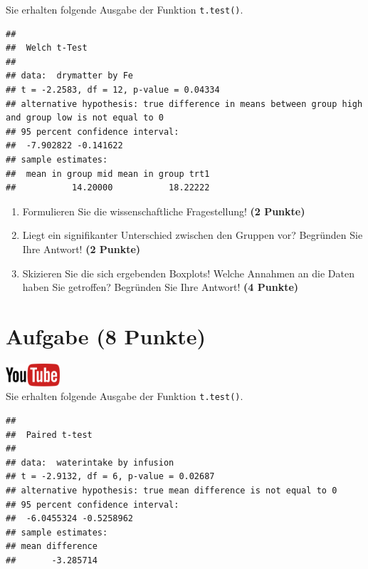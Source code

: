 \documentclass[a4paper, 10pt]{scrartcl}\usepackage[]{graphicx}\usepackage[]{xcolor}
\makeatletter
\newenvironment{kframe}{%
 \def\at@end@of@kframe{}%
 \ifinner\ifhmode%
  \def\at@end@of@kframe{\end{minipage}}%
  \begin{minipage}{\columnwidth}%
 \fi\fi%
 \def\FrameCommand##1{\hskip\@totalleftmargin \hskip-\fboxsep
 \colorbox{shadecolor}{##1}\hskip-\fboxsep
     \hskip-\linewidth \hskip-\@totalleftmargin \hskip\columnwidth}%
 \MakeFramed {\advance\hsize-\width
   \@totalleftmargin\z@ \linewidth\hsize
   \@setminipage}}%
 {\par\unskip\endMakeFramed%
 \at@end@of@kframe}
\newenvironment{knitrout}{}{} %
\makeatother
\begin{document}
Sie erhalten folgende \Rlogo Ausgabe der Funktion \texttt{t.test()}.

\begin{knitrout}
\color{fgcolor}\begin{kframe}
\begin{verbatim}
## 
## 	Welch t-Test
## 
## data:  drymatter by Fe
## t = -2.2583, df = 12, p-value = 0.04334
## alternative hypothesis: true difference in means between group high and group low is not equal to 0
## 95 percent confidence interval:
##  -7.902822 -0.141622
## sample estimates:
##  mean in group mid mean in group trt1 
##           14.20000           18.22222
\end{verbatim}
\end{kframe}
\end{knitrout}


\begin{enumerate}
  \item Formulieren Sie die wissenschaftliche Fragestellung! \textbf{(2
Punkte)}
\item Liegt ein signifikanter Unterschied zwischen den Gruppen vor?
  Begr{\"u}nden Sie Ihre Antwort! \textbf{(2 Punkte)}
\item Skizieren Sie die sich ergebenden Boxplots! Welche Annahmen an die Daten haben Sie getroffen? Begr{\"u}nden Sie Ihre Antwort! \textbf{(4 Punkte)} 
\end{enumerate}
 
\clearpage

\section{Aufgabe \hfill (8 Punkte)}

\hfill\href{https://youtu.be/kHmfEmU6lrk}{\includegraphics[width =
  2cm]{img/youtube}}\\[1Ex]


Sie erhalten folgende \Rlogo Ausgabe der Funktion \texttt{t.test()}.

\begin{knitrout}
\color{fgcolor}\begin{kframe}
\begin{verbatim}
## 
## 	Paired t-test
## 
## data:  waterintake by infusion
## t = -2.9132, df = 6, p-value = 0.02687
## alternative hypothesis: true mean difference is not equal to 0
## 95 percent confidence interval:
##  -6.0455324 -0.5258962
## sample estimates:
## mean difference 
##       -3.285714
\end{verbatim}
\end{kframe}
\end{knitrout}
\end{document}
